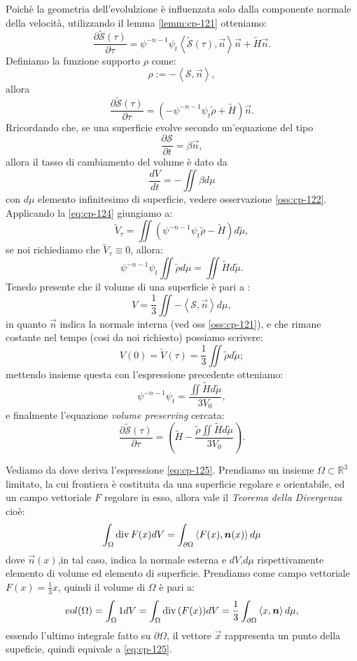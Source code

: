 Poichè la geometria dell'evolulzione è influenzata solo dalla componente normale della velocità, utilizzando il lemma \ref{lemm:cp-121} otteniamo:
\[
\frac{\partial\mathcal{\tilde{S}}(\tau)}{\partial\tau}=\psi^{-n-1}\psi_t\left<\mathcal{\tilde{S}}(\tau),\vec{n}\right>\vec{n}+\tilde{H}\vec{n}.
\]
Definiamo la funzione supporto $\rho$ come:
\[
\rho:=-\left<\mathcal{S},\vec{n}\right>,
\]
allora
\[
\frac{\partial\mathcal{\tilde{S}}(\tau)}{\partial\tau}=\left(-\psi^{-n-1}\psi_t\tilde{\rho}+\tilde{H}\right)\vec{n}.
\]
Rricordando che, se una superficie evolve secondo un'equazione del tipo
\[
\frac{\partial \mathcal{S}}{\partial t}=\beta\vec{n},
\]
allora il tasso di cambiamento del volume è dato da
\begin{equation}
\label{eq:cp-124}
\frac{d V}{d t}=-\iint\beta d\mu
\end{equation}
con $d\mu$ elemento infinitesimo di superficie, vedere osservazione \ref{oss:cp-122}.
 Applicando la \eqref{eq:cp-124} giungiamo a:
\[
\tilde{V}_{\tau}=\iint(\psi^{-n-1}\psi_t\tilde{\rho}-\tilde{H})d\tilde{\mu},
\]
se noi richiediamo che $\tilde{V}_{\tau}\equiv 0$, allora:
\[
\psi^{-n-1}\psi_t\iint\tilde{\rho}d\mu = \iint\tilde{H}d\tilde{\mu}.
\]
 Tenedo presente che il volume di una superficie è pari a :
\begin{equation}
  \label{eq:cp-125}
V=\frac{1}{3}\iint-\left<\mathcal{S},\vec{n}\right>d\mu,
\end{equation}
in quanto $\vec{n}$ indica la normale interna (ved oss \ref{oss:cp-121}), e che rimane costante nel tempo (cosi da noi richiesto) possiamo scrivere:
\[
V(0)=\tilde{V}(\tau)=\frac{1}{3}\iint\tilde{\rho}d\tilde{\mu};
\]
mettendo insieme questa con l'espressione precedente otteniamo:
\[
\psi^{-n-1}\psi_t=\frac{\iint\tilde{H}d\tilde{\mu}}{3V_0},
\]
e finalmente l'equazione \emph{volume preserving} cercata:
\begin{equation}
\label{eq:cp-126}
\frac{\partial\mathcal{\tilde{S}}(\tau)}{\partial\tau}=\left(\tilde{H}-\frac{\tilde{\rho}\iint\tilde{H}d\tilde{\mu}}{3V_0}\right).
\end{equation}
\begin{osservazione}
\label{oss:cp-121}
Vediamo da dove deriva l'espressione \eqref{eq:cp-125}. Prendiamo un insieme $\Omega\subset\mathbb{R}^3$ limitato, la cui frontiera è costituita da una superficie regolare e orientabile, ed un campo vettoriale $F$ regolare in esso, allora vale il \emph{Teorema della Divergenza} cioè:
\[
\int_{\Omega}\operatorname{div}{F(x)}dV =\int_{\partial\Omega}\left<F(x),\bm{n}(x)\right>d\mu
\]
dove $\vec{n}(x)$,in tal caso, indica la normale esterna e $dV$,$d\mu$ rispettivamente elemento di volume ed elemento di superficie. Prendiamo come campo vettoriale $F(x)=\frac{1}{3}x$, quindi il volume di $\Omega$ è pari a:
\[
vol(\Omega)=\int_{\Omega}1dV=\int_{\Omega}\operatorname{div}{(F(x))}dV=\frac{1}{3}\int_{\partial\Omega}\left<x,\bm{n}\right>d\mu,
\]
essendo l'ultimo integrale fatto su $\partial\Omega$, il vettore $\vec{x}$ rappresenta un punto della supeficie, quindi equivale a \eqref{eq:cp-125}.
\end{osservazione}

